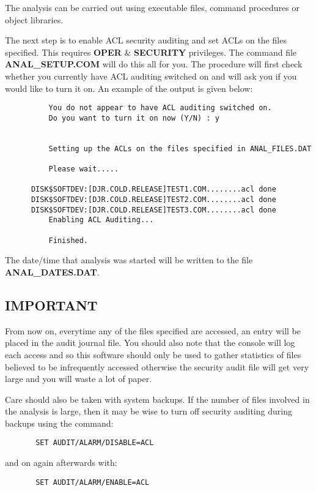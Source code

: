 The analysis can be carried out using executable files, command procedures or
object libraries.

The next step is to enable ACL security auditing and set ACLs on the files
specified. This requires {\bf OPER} \& {\bf SECURITY} privileges. The command
file {\bf ANAL\_SETUP.COM} will do this all for you. The procedure will first
check whether you currently have ACL auditing switched on and will ask you if
you would like to turn it on. An example of the output is given below:

\begin{verbatim}
          You do not appear to have ACL auditing switched on.
          Do you want to turn it on now (Y/N) : y
        
        
          Setting up the ACLs on the files specified in ANAL_FILES.DAT
        
          Please wait.....
        
      DISK$SOFTDEV:[DJR.COLD.RELEASE]TEST1.COM........acl done
      DISK$SOFTDEV:[DJR.COLD.RELEASE]TEST2.COM........acl done
      DISK$SOFTDEV:[DJR.COLD.RELEASE]TEST3.COM........acl done
          Enabling ACL Auditing...                    
        
          Finished.
\end{verbatim}
 
The date/time that analysis was started will be written to the file {\bf
ANAL\_DATES.DAT}.

\subsection{IMPORTANT}

From now on, everytime any of the files specified are accessed, an entry will
be placed in the audit journal file.  You should also note that the console
will log each access and so this software should only be used to gather
statistics of files believed to be infrequently accessed otherwise the security
audit file will get very large and you will waste a lot of paper.

Care should also be taken with system backups. If the number of files involved
in the analysis is large, then it may be wise to turn off security auditing
during backups using the command:

\begin{verbatim}
       SET AUDIT/ALARM/DISABLE=ACL
\end{verbatim}
and on again afterwards with:
\begin{verbatim}
       SET AUDIT/ALARM/ENABLE=ACL
\end{verbatim}

